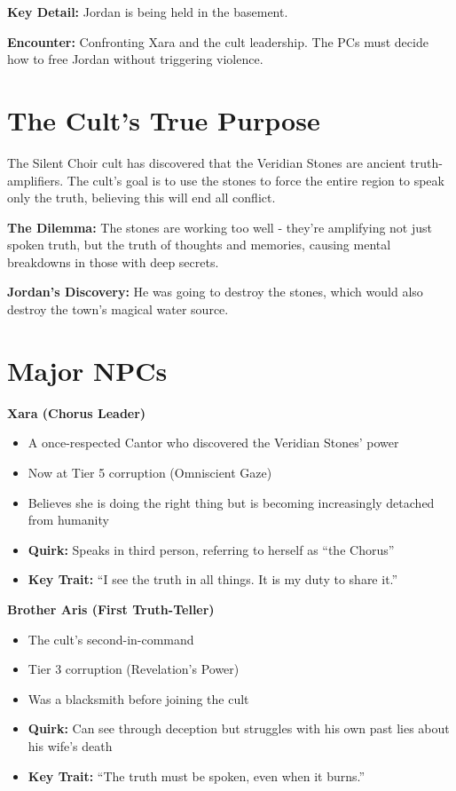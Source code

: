 \documentclass[11pt]{article}
\newcommand{\keypoint}[1]{\par\noindent\textbf{\textcolor{accentorange}{#1}}}
\newcommand{\npctitle}[1]{\par\noindent\textbf{#1}\par}
\begin{document}
\keypoint{Key Detail:} Jordan is being held in the basement.

\keypoint{Encounter:} Confronting Xara and the cult leadership. The PCs must decide how to free Jordan without triggering violence.

\section{The Cult's True Purpose}

The Silent Choir cult has discovered that the Veridian Stones are ancient truth-amplifiers. The cult's goal is to use the stones to force the entire region to speak only the truth, believing this will end all conflict.

\keypoint{The Dilemma:} The stones are working too well - they're amplifying not just spoken truth, but the truth of thoughts and memories, causing mental breakdowns in those with deep secrets.

\keypoint{Jordan's Discovery:} He was going to destroy the stones, which would also destroy the town's magical water source.

\section{Major NPCs}

\npctitle{Xara (Chorus Leader)}
\begin{itemize}[leftmargin=*]
    \item A once-respected Cantor who discovered the Veridian Stones' power
    \item Now at Tier 5 corruption (Omniscient Gaze)
    \item Believes she is doing the right thing but is becoming increasingly detached from humanity
    \item \textbf{Quirk:} Speaks in third person, referring to herself as ``the Chorus''
    \item \textbf{Key Trait:} ``I see the truth in all things. It is my duty to share it.''
\end{itemize}

\npctitle{Brother Aris (First Truth-Teller)}
\begin{itemize}[leftmargin=*]
    \item The cult's second-in-command
    \item Tier 3 corruption (Revelation's Power)
    \item Was a blacksmith before joining the cult
    \item \textbf{Quirk:} Can see through deception but struggles with his own past lies about his wife's death
    \item \textbf{Key Trait:} ``The truth must be spoken, even when it burns.''
\end{itemize}
\end{document}
